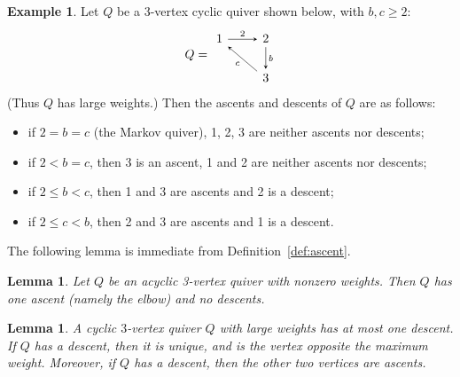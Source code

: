 \documentclass[11pt, letterpaper]{amsart}
\newtheorem{lemma}[theorem]{Lemma}
\theoremstyle{definition}
\newtheorem{example}[theorem]{Example}
\numberwithin{equation}{section}
\begin{document}
\begin{example}
\label{eg:ascents}
Let $Q$ be a 3-vertex cyclic quiver shown below, with $b, c\ge 2$: 
\begin{equation}
\label{eq:2bc-3vertex}
Q=\begin{tikzcd}[arrows={-stealth}]
  1 \arrow[r, "2"] 
  & 2 \arrow[d, "b" ] 
  \\
  & 3   \arrow[lu, "c"] 
\end{tikzcd}
\end{equation}
(Thus $Q$ has large weights.) Then the ascents and descents of $Q$ are as follows:
\begin{itemize}[leftmargin=.2in]
\item 
if $2=b=c$ (the Markov quiver), 1, 2, 3 are neither ascents nor descents; 
\item
if $2<b=c$, then 3 is an ascent, 1 and 2 are neither ascents nor descents; 
\item 
if $2\le b<c$, then 1 and 3 are ascents and 2 is a descent; 
\item
if $2\le c<b$, then 2 and 3 are ascents and 1 is a descent. 
\end{itemize}

\end{example}

The following lemma is immediate from Definition~\ref{def:ascent}. 

\begin{lemma}
\label{lem:acyclic-descent}
Let $Q$ be an acyclic 3-vertex quiver with nonzero weights. 
Then $Q$ has one ascent (namely the elbow) and no descents. 
\end{lemma}

\begin{lemma}
\label{lem:3VertexUniqueDescents}
A cyclic $3$-vertex quiver $Q$ with large weights has at most one descent. 
If $Q$ has a descent, then it is unique, and is the vertex opposite the maximum weight.
Moreover, if $Q$ has a descent, then the other two vertices are ascents. 
\end{lemma}
\end{document}
